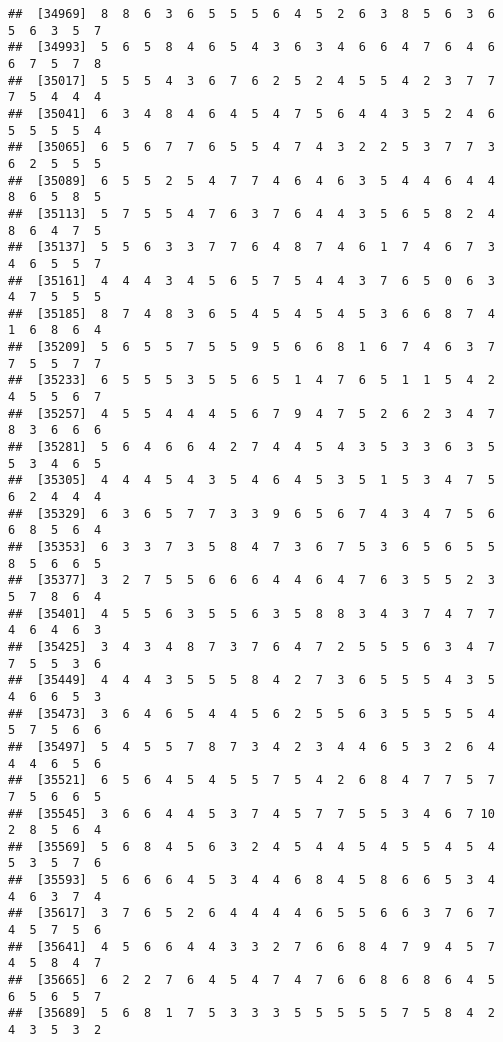 \documentclass[
]{book}
\begin{document}
\begin{verbatim}
##  [34969]  8  8  6  3  6  5  5  5  6  4  5  2  6  3  8  5  6  3  6  5  6  3  5  7
##  [34993]  5  6  5  8  4  6  5  4  3  6  3  4  6  6  4  7  6  4  6  6  7  5  7  8
##  [35017]  5  5  5  4  3  6  7  6  2  5  2  4  5  5  4  2  3  7  7  7  5  4  4  4
##  [35041]  6  3  4  8  4  6  4  5  4  7  5  6  4  4  3  5  2  4  6  5  5  5  5  4
##  [35065]  6  5  6  7  7  6  5  5  4  7  4  3  2  2  5  3  7  7  3  6  2  5  5  5
##  [35089]  6  5  5  2  5  4  7  7  4  6  4  6  3  5  4  4  6  4  4  8  6  5  8  5
##  [35113]  5  7  5  5  4  7  6  3  7  6  4  4  3  5  6  5  8  2  4  8  6  4  7  5
##  [35137]  5  5  6  3  3  7  7  6  4  8  7  4  6  1  7  4  6  7  3  4  6  5  5  7
##  [35161]  4  4  4  3  4  5  6  5  7  5  4  4  3  7  6  5  0  6  3  4  7  5  5  5
##  [35185]  8  7  4  8  3  6  5  4  5  4  5  4  5  3  6  6  8  7  4  1  6  8  6  4
##  [35209]  5  6  5  5  7  5  5  9  5  6  6  8  1  6  7  4  6  3  7  7  5  5  7  7
##  [35233]  6  5  5  5  3  5  5  6  5  1  4  7  6  5  1  1  5  4  2  4  5  5  6  7
##  [35257]  4  5  5  4  4  4  5  6  7  9  4  7  5  2  6  2  3  4  7  8  3  6  6  6
##  [35281]  5  6  4  6  6  4  2  7  4  4  5  4  3  5  3  3  6  3  5  5  3  4  6  5
##  [35305]  4  4  4  5  4  3  5  4  6  4  5  3  5  1  5  3  4  7  5  6  2  4  4  4
##  [35329]  6  3  6  5  7  7  3  3  9  6  5  6  7  4  3  4  7  5  6  6  8  5  6  4
##  [35353]  6  3  3  7  3  5  8  4  7  3  6  7  5  3  6  5  6  5  5  8  5  6  6  5
##  [35377]  3  2  7  5  5  6  6  6  4  4  6  4  7  6  3  5  5  2  3  5  7  8  6  4
##  [35401]  4  5  5  6  3  5  5  6  3  5  8  8  3  4  3  7  4  7  7  4  6  4  6  3
##  [35425]  3  4  3  4  8  7  3  7  6  4  7  2  5  5  5  6  3  4  7  7  5  5  3  6
##  [35449]  4  4  4  3  5  5  5  8  4  2  7  3  6  5  5  5  4  3  5  4  6  6  5  3
##  [35473]  3  6  4  6  5  4  4  5  6  2  5  5  6  3  5  5  5  5  4  5  7  5  6  6
##  [35497]  5  4  5  5  7  8  7  3  4  2  3  4  4  6  5  3  2  6  4  4  4  6  5  6
##  [35521]  6  5  6  4  5  4  5  5  7  5  4  2  6  8  4  7  7  5  7  7  5  6  6  5
##  [35545]  3  6  6  4  4  5  3  7  4  5  7  7  5  5  3  4  6  7 10  2  8  5  6  4
##  [35569]  5  6  8  4  5  6  3  2  4  5  4  4  5  4  5  5  4  5  4  5  3  5  7  6
##  [35593]  5  6  6  6  4  5  3  4  4  6  8  4  5  8  6  6  5  3  4  4  6  3  7  4
##  [35617]  3  7  6  5  2  6  4  4  4  4  6  5  5  6  6  3  7  6  7  4  5  7  5  6
##  [35641]  4  5  6  6  4  4  3  3  2  7  6  6  8  4  7  9  4  5  7  4  5  8  4  7
##  [35665]  6  2  2  7  6  4  5  4  7  4  7  6  6  8  6  8  6  4  5  6  5  6  5  7
##  [35689]  5  6  8  1  7  5  3  3  3  5  5  5  5  5  7  5  8  4  2  4  3  5  3  2

\end{verbatim}
\end{document}
